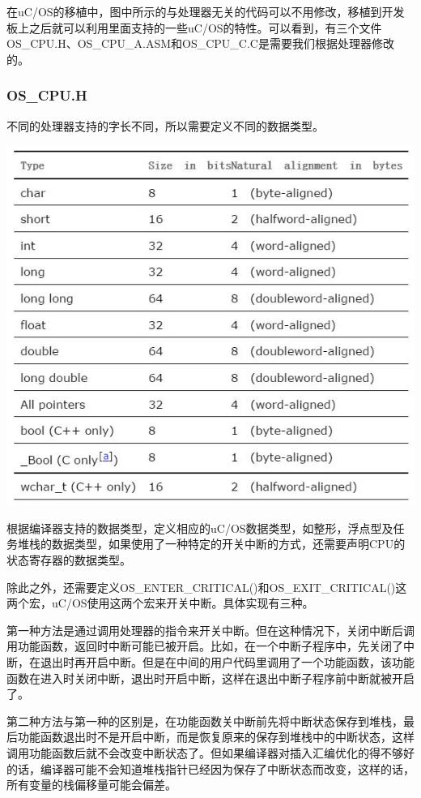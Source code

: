 \documentclass{ctexart}
\begin{document}
在uC/OS的移植中，图中所示的与处理器无关的代码可以不用修改，移植到开发板上之后就可以利用里面支持的一些uC/OS的特性。可以看到，有三个文件OS\_CPU.H、OS\_CPU\_A.ASM和OS\_CPU\_C.C是需要我们根据处理器修改的。
\subsubsection{OS\_CPU.H}
不同的处理器支持的字长不同，所以需要定义不同的数据类型。

\centerline{\includegraphics[scale=0.65]{002}}\par

根据编译器支持的数据类型，定义相应的uC/OS数据类型，如整形，浮点型及任务堆栈的数据类型，如果使用了一种特定的开关中断的方式，还需要声明CPU的状态寄存器的数据类型。

        除此之外，还需要定义OS\_ENTER\_CRITICAL()和OS\_EXIT\_CRITICAL()这两个宏，uC/OS使用这两个宏来开关中断。具体实现有三种。
        
        第一种方法是通过调用处理器的指令来开关中断。但在这种情况下，关闭中断后调用功能函数，返回时中断可能已被开启。比如，在一个中断子程序中，先关闭了中断，在退出时再开启中断。但是在中间的用户代码里调用了一个功能函数，该功能函数在进入时关闭中断，退出时开启中断，这样在退出中断子程序前中断就被开启了。
        
        第二种方法与第一种的区别是，在功能函数关中断前先将中断状态保存到堆栈，最后功能函数退出时不是开启中断，而是恢复原来的保存到堆栈中的中断状态，这样调用功能函数后就不会改变中断状态了。但如果编译器对插入汇编优化的得不够好的话，编译器可能不会知道堆栈指针已经因为保存了中断状态而改变，这样的话，所有变量的栈偏移量可能会偏差。
        
\end{document}
